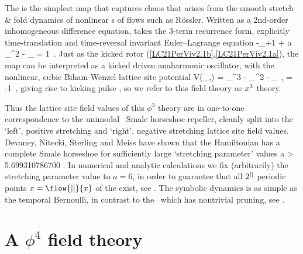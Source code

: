 The {\HenonMap} is the simplest map that captures chaos that arises from
the smooth stretch \& fold dynamics of nonlinear {\PoincMap}s of flows
such as R\"ossler.
Written as a  2nd-order inhomogeneous difference equation,
 takes the
{\em \henlatt} 3-term recurrence form, explicitly time-translation
and time-reversal invariant Euler–Lagrange equation
\beq
-\ssp_{\zeit+1} + {a}\,\ssp_{\zeit}^2 - \ssp_{} = 1
\,.
Just as the kicked rotor (\ref{LC21PerViv2.1b},\ref{LC21PerViv2.1a}), the map can
be interpreted as a kicked driven anaharmonic oscillator,
with the nonlinear, cubic Biham-Wenzel lattice site potential
\beq
V(\ssp_\zeit,\Ssym{\zeit}) =  \ssp_{\zeit}^3
                            - \ssp_{\zeit}^2 -\Ssym{\zeit}\,\ssp_\zeit
    \,,\qquad
        \Ssym{\zeit} = -1
\,,
giving rise to kicking pulse , so we
refer to this field theory as $x^3$ theory.

Thus the lattice site field values of this $\phi^3$ theory are in
one-to-one correspondence to the unimodal \HenonMap\
Smale horseshoe repeller, cleanly split into the `left', positive stretching and
`right', negative stretching lattice site field values.
Devaney, Nitecki, Sterling and Meiss
have shown that the Hamiltonian {\HenonMap} has a complete Smale
horseshoe for sufficiently large `stretching parameter' values
\beq
      a > 5.699310786700\cdots
\;.
In numerical and analytic calculations we fix
(arbitrarily) the stretching parameter value to $a=6$, in order to
guarantee that all $2^{||}$ periodic points  $\ssp=\flow{\cl{}}{\ssp}$
of the {\HenonMap} \refeq{LC21eq2.1} exist, see .
The symbolic dynamics is as simple as the temporal Bernoulli, in contrast to the
\templatt\ which has nontrivial pruning, see \reftab{tab:catMapN_n-s=3}.


\section{A {$\phi^4$} field theory}
\label{s:phi4latt}

